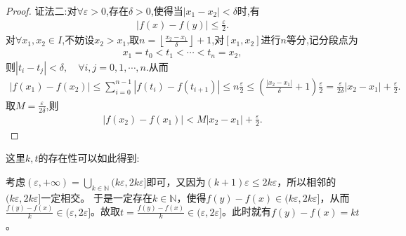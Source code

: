 \documentclass[../../main.tex]{subfiles}%
\begin{document}
\begin{proof}
{\color{blue}证法二:}对$\forall \varepsilon >0$,存在$\delta >0$,使得当$|x_1-x_2|<\delta$时,有
\begin{align*}
|f(x)-f(y)|\leqslant \frac{\varepsilon}{2}.
\end{align*}
对$\forall x_1,x_2\in I$,不妨设$x_2>x_1$,取$n=\left\lfloor \frac{x_2-x_1}{\delta} \right\rfloor +1$,对$[x_1,x_2]$进行$n$等分,记分段点为
\begin{align*}
x_1=t_0<t_1<\cdots <t_n=x_2,
\end{align*}
则$|t_i-t_j|<\delta ,\quad \forall i,j=0,1,\cdots ,n$.从而
\begin{align*}
|f(x_1)-f(x_2)|\leqslant \sum\limits_{i=0}^{n-1}{|f(t_i)-f(t_{i+1})|}\leqslant n\frac{\varepsilon}{2}\leqslant \left( \frac{|x_2-x_1|}{\delta}+1 \right) \frac{\varepsilon}{2}=\frac{\varepsilon}{2\delta}|x_2-x_1|+\frac{\varepsilon}{2}.
\end{align*}
取$M=\frac{\varepsilon}{2\delta}$,则
\begin{align*}
|f(x_2)-f(x_1)|<M|x_2-x_1|+\frac{\varepsilon}{2}.
\end{align*}
\end{proof}
\begin{remark}
\hypertarget{k,t的存在性}{这里\(k,t\)的存在性可以如此得到:}考虑\((\varepsilon,+\infty)=\bigcup_{k\in \mathbb{N}}{(k\varepsilon,2k\varepsilon]}\)即可，又因为\((k + 1)\varepsilon\leqslant 2k\varepsilon\)，所以相邻的\((k\varepsilon,2k\varepsilon]\)一定相交。
于是一定存在\(k\in \mathbb{N}\)，使得\(f(y) - f(x)\in (k\varepsilon,2k\varepsilon]\)，从而\(\frac{f(y) - f(x)}{k}\in (\varepsilon,2\varepsilon]\)。故取\(t = \frac{f(y) - f(x)}{k}\in (\varepsilon,2\varepsilon]\)。此时就有\(f(y) - f(x) = kt\)。 
\end{remark}
\end{document}
